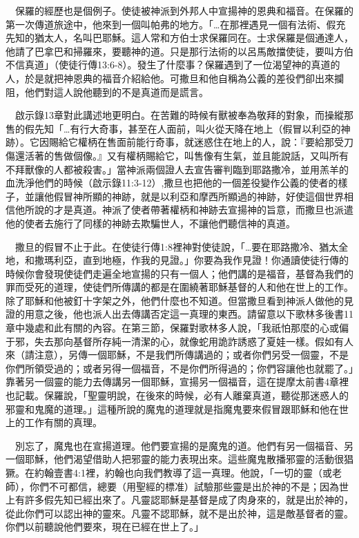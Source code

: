 \documentclass{book}
\begin{document}
　保羅的經歷也是個例子。使徒被神派到外邦人中宣揚神的恩典和福音。在保羅的第一次傳道旅途中，他來到一個叫帕弗的地方。「…在那裡遇見一個有法術、假充先知的猶太人，名叫巴耶穌。這人常和方伯士求保羅同在。士求保羅是個通達人，他請了巴拿巴和掃羅來，要聽神的道。只是那行法術的以呂馬敵擋使徒，要叫方伯不信真道」（使徒行傳13:6-8）。發生了什麼事？保羅遇到了一位渴望神的真道的人，於是就把神恩典的福音介紹給他。可撒旦和他自稱為公義的差役們卻出來攔阻，他們對這人說他聽到的不是真道而是謊言。

　啟示錄13章對此講述地更明白。在苦難的時候有獸被奉為敬拜的對象，而操縱那售的假先知「…有行大奇事，甚至在人面前，叫火從天降在地上（假冒以利亞的神跡）。它因賜給它權柄在售面前能行奇事，就迷惑住在地上的人，說：『要給那受刀傷還活著的售做個像。』又有權柄賜給它，叫售像有生氣，並且能說話，又叫所有不拜獸像的人都被殺害。」當神派兩個證人去宣告審判臨到耶路撒冷，並用羔羊的血洗淨他們的時候（啟示錄11:3-12）,撒旦也把他的一個差役變作公義的使者的樣子，並讓他假冒神所顯的神跡，就是以利亞和摩西所顯過的神跡，好使這個世界相信他所說的才是真道。神派了使者帶著權柄和神跡去宣揚神的旨意，而撒旦也派遣他的使者去施行了同樣的神跡去欺騙世人，不讓他們聽信神的真道。

　撒旦的假冒不止于此。在使徒行傳1:8裡神對使徒說，「…要在耶路撒冷、猶太全地，和撒瑪利亞，直到地極，作我的見證。」你要為我作見證！你通讀使徒行傳的時候你會發現使徒們走遍全地宣揚的只有一個人；他們講的是福音，基督為我們的罪而受死的道理，使徒們所傳講的都是在圍繞著耶穌基督的人和他在世上的工作。除了耶穌和他被釘十字架之外，他們什麼也不知道。但當撒旦看到神派人做他的見證的用意之後，他也派人出去傳講否定這一真理的東西。請留意以下歌林多後書11章中幾處和此有關的內容。在第三節，保羅對歌林多人說，「我祇怕那麼的心或偏于邪，失去那向基督所存純一清潔的心，就像蛇用詭詐誘惑了夏娃一樣。假如有人來（請注意），另傳一個耶穌，不是我們所傳講過的；或者你們另受一個靈，不是你們所領受過的；或者另得一個福音，不是你們所得過的；你們容讓他也就罷了。」靠著另一個靈的能力去傳講另一個耶穌，宣揚另一個福音，這在提摩太前書4章裡也記載。保羅說，「聖靈明說，在後來的時候，必有人離棄真道，聽從那迷惑人的邪靈和鬼魔的道理。」這種所說的魔鬼的道理就是指魔鬼要來假冒跟耶穌和他在世上的工作有關的真理。

　別忘了，魔鬼也在宣揚道理。他們要宣揚的是魔鬼的道。他們有另一個福音、另一個耶穌，他們渴望借助人把邪靈的能力表現出來。這些魔鬼散播邪靈的活動很猖獗。在約翰壹書4:1裡，約翰也向我們教導了這一真理。他說，「一切的靈（或老師），你們不可都信，總要（用聖經的標准）試驗那些靈是出於神的不是；因為世上有許多假先知已經出來了。凡靈認耶穌是基督是成了肉身來的，就是出於神的，從此你們可以認出神的靈來。凡靈不認耶穌，就不是出於神，這是敵基督者的靈。你們以前聽說他們要來，現在已經在世上了。」
\end{document}
